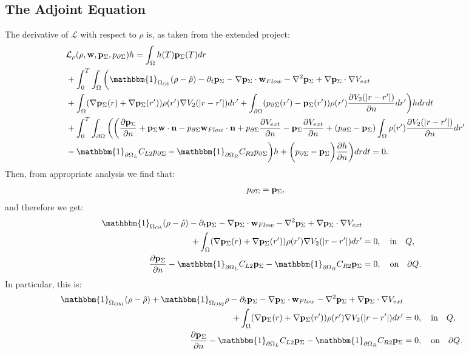 \subsection*{The Adjoint Equation}
The derivative of $\mathcal{L}$ with respect to $\rho$ is, as taken from the extended project:
\begin{align*}
&\mathcal{L}_\rho (\rho,\mathbf{w},\Adja,\Adjc)h=
\int_\Omega h(T) \Adja(T) dr\\
&+ \int_0^T \int_\Omega \bigg( \mathbbm{1}_{ \Omega_{Ob}} (\rho- \hat{\rho})  - \partial_t \Adja  - \nabla \Adja \cdot \mathbf{w}_{Flow}  - \nabla^2 \Adja \notag 
+  \nabla \Adja \cdot \nabla V_{ext}  \notag \\
&+ \int_\Omega (\nabla  \Adja(r)+\nabla  \Adja(r')) \rho(r') \nabla V_2(|r-r'|) dr'+ \int_{\partial \Omega} ( \Adjc(r') - \Adja(r')) \rho(r')   \frac{\partial V_2(|r-r'|)}{\partial n} dr' \bigg) h dr dt \\
&+  \int_0^T\int_{\partial \Omega}  \bigg(
\bigg(\frac{\partial \Adja }{\partial n} + \Adja  \mathbf{w} \cdot \mathbf{n} - \Adjc \mathbf{w}_{Flow} \cdot \mathbf{n}  +  \Adjc \dfrac{\partial V_{ext}}{\partial n} - \Adja \frac{\partial V_{ext}}{\partial n} + ( \Adjc - \Adja)  \int_\Omega \rho(r') \frac{\partial V_2(|r-r'|)}{\partial n} dr'\\
& -\mathbbm{1}_{\partial \Omega_L} C_{L2} \Adjc   -\mathbbm{1}_{\partial \Omega_R} C_{R2} \Adjc \bigg)h + \bigg( \Adjc- \Adja \bigg) \frac{\partial h}{\partial n} \bigg) dr dt =0.
\end{align*}
Then, from appropriate analysis we find that:
\begin{align*}
p_{\partial \Sigma} = \mathbf{p}_\Sigma,
\end{align*}
and therefore we get:
\begin{align*}
\mathbbm{1}_{\Omega_{Ob}}(\rho- \hat{\rho})   - \partial_t  \Adja  - \nabla \Adja \cdot \mathbf{w}_{Flow}  - \nabla^2 \Adja \notag 
+  \nabla \Adja \cdot \nabla V_{ext}  \notag \\
+ \int_\Omega (\nabla  \Adja(r)+\nabla  \Adja(r')) \rho(r') \nabla V_2(|r-r'|) dr' &=0, \quad \text{in} \quad Q, \\
\frac{\partial \Adja }{\partial n}  -\mathbbm{1}_{\partial \Omega_L} C_{L2} \Adja   -\mathbbm{1}_{\partial \Omega_R} C_{R2} \Adja&=0, \quad \text{on} \quad \partial Q.
\end{align*}
In particular, this is:
\begin{align*}
\mathbbm{1}_{\Omega_{Ob1}}(\rho- \hat{\rho}) +\mathbbm{1}_{\Omega_{Ob2}}\rho  - \partial_t  \Adja  - \nabla \Adja \cdot \mathbf{w}_{Flow}  - \nabla^2 \Adja \notag 
+  \nabla \Adja \cdot \nabla V_{ext}  \notag \\
+ \int_\Omega (\nabla  \Adja(r)+\nabla  \Adja(r')) \rho(r') \nabla V_2(|r-r'|) dr' &=0, \quad \text{in} \quad Q, \\
\frac{\partial \Adja }{\partial n}  -\mathbbm{1}_{\partial \Omega_L} C_{L2} \Adja   -\mathbbm{1}_{\partial \Omega_R} C_{R2} \Adja&=0, \quad \text{on} \quad \partial Q.
\end{align*}




